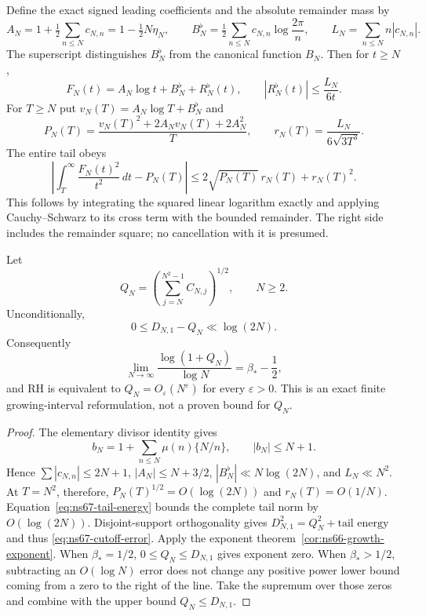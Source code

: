Define the exact signed leading coefficients and the absolute remainder
mass by
\[
 A_N=1+\tfrac12\sum_{n\leq N}c_{N,n}=1-\tfrac12N\eta_N,
 \qquad B_N^\flat=\tfrac12\sum_{n\leq N}c_{N,n}\log\frac{2\pi}{n},
 \qquad L_N=\sum_{n\leq N}n|c_{N,n}|.
\]
The superscript distinguishes $B_N^\flat$ from the canonical function $B_N$.
Then for $t\geq N$,
\begin{equation}
 F_N(t)=A_N\log t+B_N^\flat+R_N^\flat(t),\qquad
 |R_N^\flat(t)|\leq\frac{L_N}{6t}.
 \label{eq:ns67-full-tail}
\end{equation}
For $T\geq N$ put $v_N(T)=A_N\log T+B_N^\flat$ and
\[
 P_N(T)=\frac{v_N(T)^2+2A_Nv_N(T)+2A_N^2}{T},\qquad
 r_N(T)=\frac{L_N}{6\sqrt{3T^3}}.
\]
The entire tail obeys
\begin{equation}
 \left|\int_T^\infty\frac{F_N(t)^2}{t^2}\,dt-P_N(T)\right|
       \leq2\sqrt{P_N(T)}\,r_N(T)+r_N(T)^2.
 \label{eq:ns67-tail-energy}
\end{equation}
This follows by integrating the squared linear logarithm exactly and
applying Cauchy--Schwarz to its cross term with the bounded remainder.
The right side includes the remainder square; no cancellation with it
is presumed.

\begin{proposition}
\label{prop:ns67-polynomial-cutoff}
Let
\[
 Q_N=\left(\sum_{j=N}^{N^2-1}C_{N,j}\right)^{1/2},\qquad N\geq2.
\]
Unconditionally,
\begin{equation}
 0\leq D_{N,1}-Q_N\ll\log(2N).
 \label{eq:ns67-cutoff-error}
\end{equation}
Consequently
\[
 \lim_{N\to\infty}\frac{\log(1+Q_N)}{\log N}=\beta_*-\frac12,
\]
and RH is equivalent to $Q_N=O_\varepsilon(N^\varepsilon)$ for every
$\varepsilon>0$. This is an exact finite growing-interval reformulation,
not a proven bound for $Q_N$.
\end{proposition}
\begin{proof}
The elementary divisor identity gives
\[
 b_N=1+\sum_{n\leq N}\mu(n)\{N/n\},\qquad |b_N|\leq N+1.
\]
Hence $\sum|c_{N,n}|\leq2N+1$, $|A_N|\leq N+3/2$,
$|B_N^\flat|\ll N\log(2N)$, and $L_N\ll N^2$.
At $T=N^2$, therefore, $P_N(T)^{1/2}=O(\log(2N))$ and
$r_N(T)=O(1/N)$. Equation~\eqref{eq:ns67-tail-energy} bounds the
complete tail norm by $O(\log(2N))$. Disjoint-support orthogonality
gives $D_{N,1}^2=Q_N^2+\text{tail energy}$ and thus
\eqref{eq:ns67-cutoff-error}.
Apply the exponent theorem~\ref{cor:ns66-growth-exponent}. When
$\beta_*=1/2$, $0\leq Q_N\leq D_{N,1}$ gives exponent zero.
When $\beta_*>1/2$, subtracting an $O(\log N)$ error does not change
any positive power lower bound coming from a zero to the right of the
line. Take the supremum over those zeros and combine with the upper
bound $Q_N\leq D_{N,1}$.
\end{proof}


